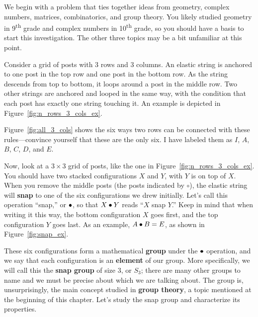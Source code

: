 \documentclass[../gatm.tex]{subfiles}
\begin{document}

\noindent We begin with a problem that ties together ideas from geometry, complex numbers, matrices, combinatorics, and group theory.
You likely studied geometry in 9\textsuperscript{th} grade and complex numbers in 10\textsuperscript{th} grade, so you should have a basis to start this investigation.
The other three topics may be a bit unfamiliar at this point.

Consider a grid of posts with $3$ rows and $3$ columns.
An elastic string is anchored to one post in the top row and one post in the bottom row.
As the string descends from top to bottom, it loops around a post in the middle row.
Two other strings are anchored and looped in the same way, with the condition that each post has exactly one string touching it.
An example is depicted in Figure~\ref{fig:n_rows_3_cols_ex}.

Figure~\ref{fig:all_3_cols} shows the six ways two rows can be connected with these rules---convince yourself that these are the only six.
I have labeled them as $I$, $A$, $B$, $C$, $D$, and $E$.

Now, look at a $3\times 3$ grid of posts, like the one in Figure~\ref{fig:n_rows_3_cols_ex}.
You should have two stacked configurations $X$ and $Y$, with $Y$ is on top of $X$.
When you remove the middle posts (the posts indicated by $\circ$), the elastic string will \textbf{snap} to one of the six configurations we drew initially.
Let's call this operation ``snap,'' or $\bullet$, so that $X\bullet Y$ reads ``$X$ snap $Y$.''
Keep in mind that when writing it this way, the bottom configuration $X$ goes first, and the top configuration $Y$ goes last.
As an example, $A\bullet B = E$, as shown in Figure~\ref{fig:snap_ex}.

These six configurations form a mathematical \textbf{group} under the $\bullet$ operation, and we say that each configuration is an \textbf{element} of our group.
More specifically, we will call this the \textbf{snap group} of size $3$, or $S_3$; there are many other groups to name and we must be precise about which we are talking about.
The group is, unsurprisingly, the main concept studied in \textbf{group theory}, a topic mentioned at the beginning of this chapter.
Let's study the snap group and characterize its properties.
\end{document}
